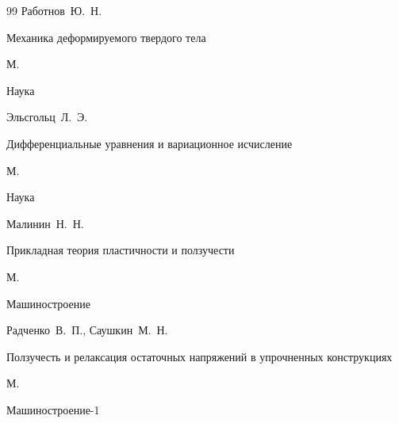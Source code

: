\begin{thebibliography}{99}
\by Работнов~Ю.~Н.

\book Механика деформируемого твердого тела

\publaddr М.

\publ Наука






\by Эльсгольц~Л.~Э.

\book Дифференциальные уравнения и вариационное исчисление

\publaddr М.

\publ Наука






\by Малинин~Н.~Н.

\book Прикладная теория пластичности и ползучести

\publaddr М.

\publ Машиностроение






\by Радченко~В.~П., Саушкин~М.~Н.

\book Ползучесть и релаксация остаточных напряжений в упрочненных конструкциях

\publaddr М.

\publ Машиностроение-1






\end{thebibliography}



\RuDate





\newpage





\makeentitle









